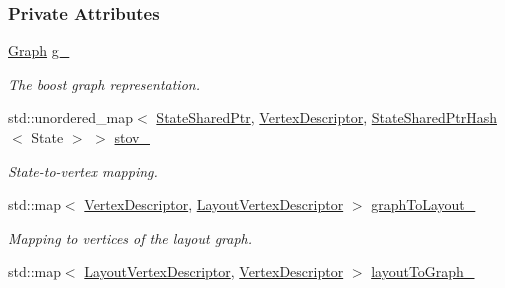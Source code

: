 \subsubsection*{Private Attributes}
\begin{DoxyCompactItemize}
\item 
\hyperlink{structslb_1_1core_1_1ui_1_1StateGraph_af2cacea8f7165ee45140ff842a243c90}{Graph} \hyperlink{structslb_1_1core_1_1ui_1_1StateGraph_a18275db28c4bab5cf98bf52a9e3a5a58}{g\+\_\+}\hypertarget{structslb_1_1core_1_1ui_1_1StateGraph_a18275db28c4bab5cf98bf52a9e3a5a58}{}\label{structslb_1_1core_1_1ui_1_1StateGraph_a18275db28c4bab5cf98bf52a9e3a5a58}

\begin{DoxyCompactList}\small\item\em The boost graph representation. \end{DoxyCompactList}\item 
std\+::unordered\+\_\+map$<$ \hyperlink{structslb_1_1core_1_1ui_1_1StateGraph_a367045176eaaf1580231bf5a4c35e2f8}{State\+Shared\+Ptr}, \hyperlink{structslb_1_1core_1_1ui_1_1StateGraph_ab2d88fce7d30dc6346910900212a7e6d}{Vertex\+Descriptor}, \hyperlink{structslb_1_1core_1_1util_1_1StateSharedPtrHash}{State\+Shared\+Ptr\+Hash}$<$ State $>$ $>$ \hyperlink{structslb_1_1core_1_1ui_1_1StateGraph_a03d2f0c74daa3badf70c096ab2367db0}{stov\+\_\+}\hypertarget{structslb_1_1core_1_1ui_1_1StateGraph_a03d2f0c74daa3badf70c096ab2367db0}{}\label{structslb_1_1core_1_1ui_1_1StateGraph_a03d2f0c74daa3badf70c096ab2367db0}

\begin{DoxyCompactList}\small\item\em State-\/to-\/vertex mapping. \end{DoxyCompactList}\item 
std\+::map$<$ \hyperlink{structslb_1_1core_1_1ui_1_1StateGraph_ab2d88fce7d30dc6346910900212a7e6d}{Vertex\+Descriptor}, \hyperlink{structslb_1_1core_1_1ui_1_1StateGraph_ac4690596402a1b99f516532605a961d5}{Layout\+Vertex\+Descriptor} $>$ \hyperlink{structslb_1_1core_1_1ui_1_1StateGraph_a0b24478dc038ce8bd1b03c86969e92e4}{graph\+To\+Layout\+\_\+}\hypertarget{structslb_1_1core_1_1ui_1_1StateGraph_a0b24478dc038ce8bd1b03c86969e92e4}{}\label{structslb_1_1core_1_1ui_1_1StateGraph_a0b24478dc038ce8bd1b03c86969e92e4}

\begin{DoxyCompactList}\small\item\em Mapping to vertices of the layout graph. \end{DoxyCompactList}\item 
std\+::map$<$ \hyperlink{structslb_1_1core_1_1ui_1_1StateGraph_ac4690596402a1b99f516532605a961d5}{Layout\+Vertex\+Descriptor}, \hyperlink{structslb_1_1core_1_1ui_1_1StateGraph_ab2d88fce7d30dc6346910900212a7e6d}{Vertex\+Descriptor} $>$ \hyperlink{structslb_1_1core_1_1ui_1_1StateGraph_a865824b7c07448cc5e03899842596b1c}{layout\+To\+Graph\+\_\+}\hypertarget{structslb_1_1core_1_1ui_1_1StateGraph_a865824b7c07448cc5e03899842596b1c}{}\label{structslb_1_1core_1_1ui_1_1StateGraph_a865824b7c07448cc5e03899842596b1c}


\end{DoxyCompactItemize}
